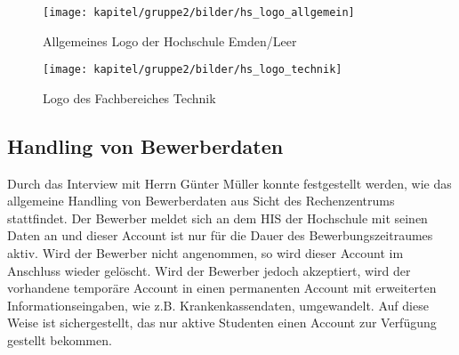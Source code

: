 \begin{figure}[h!]
	\centering
	\texttt{[image: kapitel/gruppe2/bilder/hs\_logo\_allgemein]}
	\caption{Allgemeines Logo der Hochschule Emden/Leer}
	\label{fig_logo_allgemein}
\end{figure}

\begin{figure}[h!]
	\centering
	\texttt{[image: kapitel/gruppe2/bilder/hs\_logo\_technik]}
	\caption{Logo des Fachbereiches Technik}
	\label{fig_logo_fb_technik}
\end{figure}

\subsection{Handling von Bewerberdaten}
Durch das Interview mit Herrn Günter Müller konnte festgestellt werden, wie das allgemeine Handling von Bewerberdaten aus Sicht des Rechenzentrums stattfindet. 
Der Bewerber meldet sich an dem HIS der Hochschule mit seinen Daten an und dieser Account ist nur für die Dauer des Bewerbungszeitraumes aktiv. Wird der Bewerber nicht angenommen, so wird dieser Account im Anschluss wieder gelöscht. Wird der Bewerber jedoch akzeptiert, wird der vorhandene temporäre Account in einen permanenten Account mit erweiterten Informationseingaben, wie z.B. Krankenkassendaten, umgewandelt. Auf diese Weise ist sichergestellt, das nur aktive Studenten einen Account zur Verfügung gestellt bekommen.